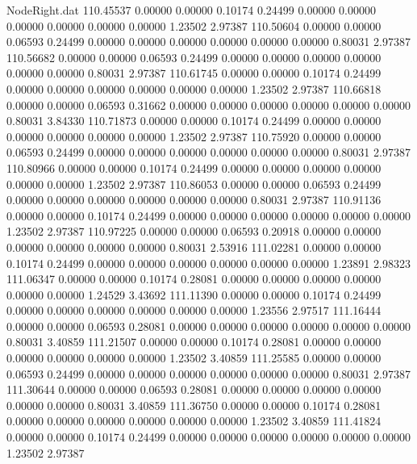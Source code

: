 \begin{filecontents}{NodeRight.dat}
 110.45537    0.00000    0.00000     0.10174    0.24499    0.00000    0.00000    0.00000    0.00000    0.00000    0.00000    1.23502    2.97387
 110.50604    0.00000    0.00000     0.06593    0.24499    0.00000    0.00000    0.00000    0.00000    0.00000    0.00000    0.80031    2.97387
 110.56682    0.00000    0.00000     0.06593    0.24499    0.00000    0.00000    0.00000    0.00000    0.00000    0.00000    0.80031    2.97387
 110.61745    0.00000    0.00000     0.10174    0.24499    0.00000    0.00000    0.00000    0.00000    0.00000    0.00000    1.23502    2.97387
 110.66818    0.00000    0.00000     0.06593    0.31662    0.00000    0.00000    0.00000    0.00000    0.00000    0.00000    0.80031    3.84330
 110.71873    0.00000    0.00000     0.10174    0.24499    0.00000    0.00000    0.00000    0.00000    0.00000    0.00000    1.23502    2.97387
 110.75920    0.00000    0.00000     0.06593    0.24499    0.00000    0.00000    0.00000    0.00000    0.00000    0.00000    0.80031    2.97387
 110.80966    0.00000    0.00000     0.10174    0.24499    0.00000    0.00000    0.00000    0.00000    0.00000    0.00000    1.23502    2.97387
 110.86053    0.00000    0.00000     0.06593    0.24499    0.00000    0.00000    0.00000    0.00000    0.00000    0.00000    0.80031    2.97387
 110.91136    0.00000    0.00000     0.10174    0.24499    0.00000    0.00000    0.00000    0.00000    0.00000    0.00000    1.23502    2.97387
 110.97225    0.00000    0.00000     0.06593    0.20918    0.00000    0.00000    0.00000    0.00000    0.00000    0.00000    0.80031    2.53916
 111.02281    0.00000    0.00000     0.10174    0.24499    0.00000    0.00000    0.00000    0.00000    0.00000    0.00000    1.23891    2.98323
 111.06347    0.00000    0.00000     0.10174    0.28081    0.00000    0.00000    0.00000    0.00000    0.00000    0.00000    1.24529    3.43692
 111.11390    0.00000    0.00000     0.10174    0.24499    0.00000    0.00000    0.00000    0.00000    0.00000    0.00000    1.23556    2.97517
 111.16444    0.00000    0.00000     0.06593    0.28081    0.00000    0.00000    0.00000    0.00000    0.00000    0.00000    0.80031    3.40859
 111.21507    0.00000    0.00000     0.10174    0.28081    0.00000    0.00000    0.00000    0.00000    0.00000    0.00000    1.23502    3.40859
 111.25585    0.00000    0.00000     0.06593    0.24499    0.00000    0.00000    0.00000    0.00000    0.00000    0.00000    0.80031    2.97387
 111.30644    0.00000    0.00000     0.06593    0.28081    0.00000    0.00000    0.00000    0.00000    0.00000    0.00000    0.80031    3.40859
 111.36750    0.00000    0.00000     0.10174    0.28081    0.00000    0.00000    0.00000    0.00000    0.00000    0.00000    1.23502    3.40859
 111.41824    0.00000    0.00000     0.10174    0.24499    0.00000    0.00000    0.00000    0.00000    0.00000    0.00000    1.23502    2.97387
\end{filecontents}
